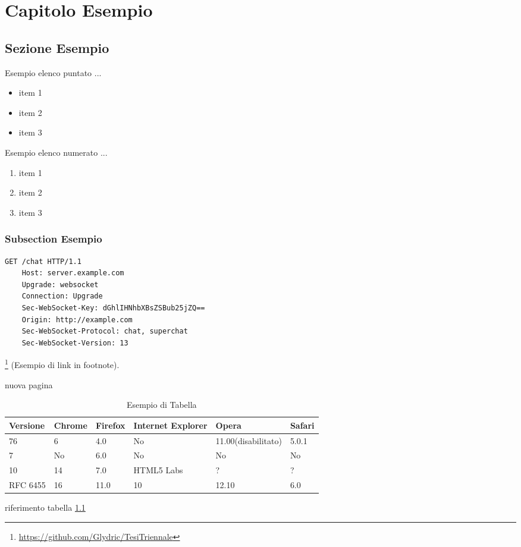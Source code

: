 \chapter{Capitolo Esempio}
\label{chap:CapitoloEsempio}

\section{Sezione Esempio}
\label{sec:real-time}

Esempio elenco puntato ...
\begin{itemize}
	\item item 1
	\item item 2
	\item item 3
\end{itemize}
Esempio elenco numerato ...
\begin{enumerate}
	\item item 1
	\item item 2
	\item item 3
\end{enumerate}

\subsection{Subsection Esempio}
\label{sec:es}

\begin{lstlisting}[caption={Esempio di listing}, style=javaScriptCode]
	GET /chat HTTP/1.1
	Host: server.example.com
	Upgrade: websocket
	Connection: Upgrade
	Sec-WebSocket-Key: dGhlIHNhbXBsZSBub25jZQ==
	Origin: http://example.com
	Sec-WebSocket-Protocol: chat, superchat
	Sec-WebSocket-Version: 13
\end{lstlisting} 

\footnote{\url{https://github.com/Glydric/TesiTriennale}} (Esempio di link in footnote).

\newpage
nuova pagina

\begin{table}[htbp]
	\begin{center}
		\begin{tabular}{|l|l|l|l|l|l|}
			\hline
			Versione & Chrome & Firefox & Internet Explorer & Opera & Safari \\
			\hline
			76 & 6 & 4.0 & No & 11.00(disabilitato) & 5.0.1\\
			\hline
			7 & No & 6.0 & No & No & No \\
			\hline
			10 & 14 & 7.0 & HTML5 Labs & ? & ?\\
			\hline
			RFC 6455 & 16 & 11.0 & 10 & 12.10 & 6.0\\
			\hline
		\end{tabular}
	\end{center}
	\caption{Esempio di Tabella}
	\label{tab:browser}
\end{table}

riferimento tabella \ref{tab:browser}

